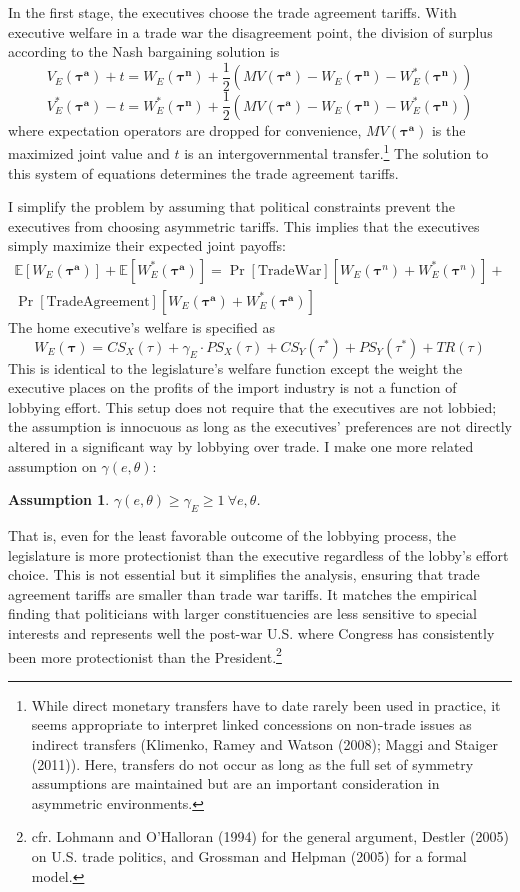 \documentclass[10pt]{article}
\newtheorem{assumption}{Assumption}
\newcommand{\ta}{\theta}
\newcommand{\expect}{\mathbb{E}}
\newcommand{\bta}{\bm{\tau^a}}
\newcommand{\btn}{\bm{\tau^n}}
\newcommand{\ga}{\gamma}
\begin{document}
In the first stage, the executives choose the trade agreement tariffs. With executive welfare in a trade war the disagreement point, the division of surplus according to the Nash bargaining solution is
\[
  V_E(\bta) + t = W_E(\btn) + \frac{1}{2} \left( MV(\bta) - W_E(\btn) - W_E^*(\btn) \right)
\]
\[
  V_E^*(\bta) - t = W_E^*(\btn) + \frac{1}{2} \left( MV(\bta) - W_E(\btn) - W_E^*(\btn) \right)
\]
where expectation operators are dropped for convenience, $MV(\bta)$ is the maximized joint value and $t$ is an intergovernmental transfer.\footnote{While direct monetary transfers have to date rarely been used in practice, it seems appropriate to interpret linked concessions on non-trade issues as indirect transfers (Klimenko, Ramey and Watson (2008); Maggi and Staiger (2011)). Here, transfers do not occur as long as the full set of symmetry assumptions are maintained but are an important consideration in asymmetric environments.} The solution to this system of equations determines the trade agreement tariffs.

I simplify the problem by assuming that political constraints prevent the executives from choosing asymmetric tariffs. This implies that the executives simply maximize their expected joint payoffs:
\begin{multline}
  \expect \left[W_E(\bta) \right] + \expect \left[ W_E^{*}(\bta) \right] = \Pr\left[ \text{TradeWar} \right] \left[W_E(\bm{\tau}^{\mathit{n}}) + W_E^*(\bm{\tau}^{\mathit{n}}) \right] + \\ \Pr\left[ \text{TradeAgreement} \right] \left[W_E(\bta) + W_E^*(\bta) \right]
  \label{eq:jv}
\end{multline}
The home executive's welfare is specified as
\[
  W_E(\bm{\tau}) = \mathit{CS}_X(\tau) + \ga_E \cdot \mathit{PS}_X(\tau) + \mathit{CS}_Y(\tau^*) + \mathit{PS}_Y(\tau^*) + \mathit{TR}(\tau)
\]
This is identical to the legislature's welfare function except the weight the executive places on the profits of the import industry is not a function of lobbying effort. This setup does not require that the executives are not lobbied; the assumption is innocuous as long as the executives' preferences are not directly altered in a significant way by lobbying over trade. I make one more related assumption on $\ga(e,\ta)$:

\begin{assumption}
  $\ga(e,\ta) \geq \ga_E \geq 1 \ \forall e,\ta$.
  \label{as:ga_l_e}
\end{assumption}

That is, even for the least favorable outcome of the lobbying process, the legislature is more protectionist than the executive regardless of the lobby's effort choice. This is not essential but it simplifies the analysis, ensuring that trade agreement tariffs are smaller than trade war tariffs. It matches the empirical finding that politicians with larger constituencies are less sensitive to special interests and represents well the post-war U.S. where Congress has consistently been more protectionist than the President.\footnote{cfr. Lohmann and O'Halloran (1994) for the general argument, Destler (2005) on U.S. trade politics, and Grossman and Helpman (2005) for a formal model.}
\end{document}
